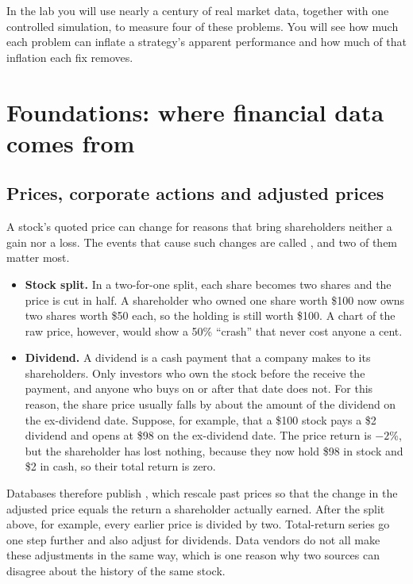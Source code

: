 In the lab you will use nearly a century of real market data, together with one controlled simulation, to measure four of these problems. You will see how much each problem can inflate a strategy's apparent performance and how much of that inflation each fix removes.


\section{Foundations: where financial data comes from}
\label{sec:02-foundations}

\subsection{Prices, corporate actions and adjusted prices}

A stock's quoted price can change for reasons that bring shareholders neither a gain nor a loss. The events that cause such changes are called , and two of them matter most.

\begin{itemize}
  \item \textbf{Stock split.} In a two-for-one split, each share becomes two shares and the price is cut in half. A shareholder who owned one share worth \$100 now owns two shares worth \$50 each, so the holding is still worth \$100. A chart of the raw price, however, would show a 50\% ``crash'' that never cost anyone a cent.
  \item \textbf{Dividend.} A dividend is a cash payment that a company makes to its shareholders. Only investors who own the stock before the  receive the payment, and anyone who buys on or after that date does not. For this reason, the share price usually falls by about the amount of the dividend on the ex-dividend date. Suppose, for example, that a \$100 stock pays a \$2 dividend and opens at \$98 on the ex-dividend date. The price return is $-2$\%, but the shareholder has lost nothing, because they now hold \$98 in stock and \$2 in cash, so their total return is zero.
\end{itemize}

Databases therefore publish , which rescale past prices so that the change in the adjusted price equals the return a shareholder actually earned. After the split above, for example, every earlier price is divided by two. Total-return series go one step further and also adjust for dividends. Data vendors do not all make these adjustments in the same way, which is one reason why two sources can disagree about the history of the same stock.

